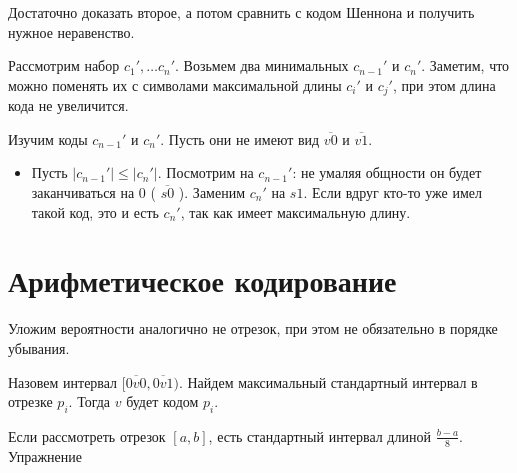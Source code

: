 Достаточно доказать второе, а потом сравнить с кодом Шеннона и получить нужное неравенство.

Рассмотрим набор $  c_1', \ldots c_n'$.  Возьмем два минимальных $ c_{n-1}'$ и $ c_n'$. Заметим, что можно поменять их с символами максимальной длины  $ c_i'$ и $ c_j'$, при этом длина кода не увеличится.

Изучим коды $ c_{n-1}'$ и $ c_n'$. Пусть они не имеют вид $ \overline{v 0}$ и $ \overline{v 1}$.
\begin{itemize}
	\item Пусть $ \lvert c_{n-1}' \rvert  \le  \lvert c_n' \rvert $. Посмотрим на $ c_{n-1}'$: не умаляя общности он будет заканчиваться на $ 0$ ( $ \overline{s 0}$ ). Заменим $ c_n'$ на $ s 1$. Если вдруг кто-то уже имел такой код, это и есть  $ c_n'$, так как имеет максимальную длину.

\end{itemize}

\section{Арифметическое кодирование}
Уложим вероятности аналогично не отрезок, при этом не обязательно в порядке убывания.

Назовем  интервал $ \bigl[\overline{0 v 0}, \overline{0 v 1}\bigr)$. Найдем максимальный стандартный интервал в отрезке $ p_i$. Тогда $ v$ будет кодом  $ p_i$.

\begin{proof*}
	Если рассмотреть отрезок $ [a, b]$, есть стандартный интервал длиной  $ \frac{b-a}{8}$. Упражнение
\end{proof*}

